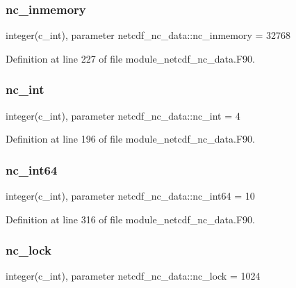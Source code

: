 \subsubsection{\texorpdfstring{nc\+\_\+inmemory}{nc\_inmemory}}
{\footnotesize\ttfamily integer(c\+\_\+int), parameter netcdf\+\_\+nc\+\_\+data\+::nc\+\_\+inmemory = 32768}



Definition at line 227 of file module\+\_\+netcdf\+\_\+nc\+\_\+data.\+F90.

\mbox{\label{namespacenetcdf__nc__data_ace0e95a04f7e62638aeb03fd25aebf16}} 
\subsubsection{\texorpdfstring{nc\+\_\+int}{nc\_int}}
{\footnotesize\ttfamily integer(c\+\_\+int), parameter netcdf\+\_\+nc\+\_\+data\+::nc\+\_\+int = 4}



Definition at line 196 of file module\+\_\+netcdf\+\_\+nc\+\_\+data.\+F90.

\mbox{\label{namespacenetcdf__nc__data_adc6c029282e0811fc416812aa43411f6}} 
\subsubsection{\texorpdfstring{nc\+\_\+int64}{nc\_int64}}
{\footnotesize\ttfamily integer(c\+\_\+int), parameter netcdf\+\_\+nc\+\_\+data\+::nc\+\_\+int64 = 10}



Definition at line 316 of file module\+\_\+netcdf\+\_\+nc\+\_\+data.\+F90.

\mbox{\label{namespacenetcdf__nc__data_ae12d4f97414d40d37a87d41a522912f1}} 
\subsubsection{\texorpdfstring{nc\+\_\+lock}{nc\_lock}}
{\footnotesize\ttfamily integer(c\+\_\+int), parameter netcdf\+\_\+nc\+\_\+data\+::nc\+\_\+lock = 1024}



